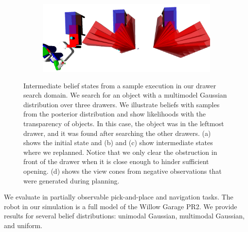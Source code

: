 \begin{figure}
\begin{subfigure}[b]{0.48\linewidth}
    \caption{}
    \label{fig:step4}
  \end{subfigure}
  \begin{subfigure}[b]{0.48\linewidth}
    \includegraphics[width=\textwidth]{drawer_images/drawer_dist_negreg.png}
    \caption{}
    \label{fig:step5}
  \end{subfigure}
  \caption{Intermediate belief states from a sample execution in our
    drawer search domain. We search for an object with a multimodel
    Gaussian distribution over three drawers. We illustrate beliefs with
    samples from the posterior distribution and show likelihoods with
    the transparency of objects. In this case, the object was in the
    leftmost drawer, and it was found after searching the other
    drawers. (a) shows the initial state and (b) and (c) show
    intermediate states where we replanned. Notice that we only clear
    the obstruction in front of the drawer when it is close enough to hinder sufficient opening.
    (d) shows the view cones from negative observations that were generated during planning.}
  \label{fig:drawerimgs}
\end{figure}


We evaluate \ibsp{} in partially observable pick-and-place and navigation tasks.
The robot in our simulation is a full model of the Willow Garage PR2. We
provide results for several belief distributions: unimodal Gaussian, multimodal
Gaussian, and uniform.
